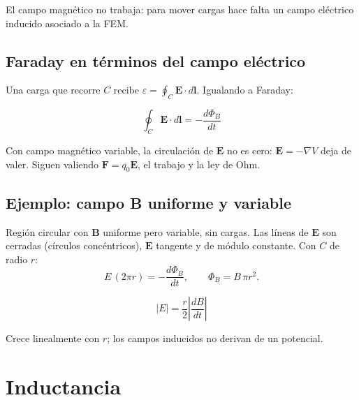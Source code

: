 \documentclass[12pt,a4paper]{article}
\begin{document}
El campo magnético no trabaja: para mover cargas hace falta un campo eléctrico
inducido asociado a la FEM.

\subsection{Faraday en términos del campo eléctrico}

Una carga que recorre $C$ recibe $\varepsilon = \oint_C \mathbf{E}\cdot
d\mathbf{l}$. Igualando a Faraday:

\begin{keybox}
  \[
  \boxed{\oint_C \mathbf{E}\cdot d\mathbf{l} = -\frac{d\Phi_B}{dt}}
  \]
\end{keybox}

\begin{warnbox}
  Con campo magnético variable, la circulación de $\mathbf{E}$ no es cero:
  $\mathbf{E} = -\nabla V$ deja de valer. Siguen valiendo $\mathbf{F}=q_0
  \mathbf{E}$, el trabajo y la ley de Ohm.
\end{warnbox}



\subsection{Ejemplo: campo B uniforme y variable}

Región circular con $\mathbf{B}$ uniforme pero variable, sin cargas. Las líneas
de $\mathbf{E}$ son cerradas (círculos concéntricos), $\mathbf{E}$ tangente y de
módulo constante. Con $C$ de radio $r$:
\[
E\,(2\pi r) = -\frac{d\Phi_B}{dt}, \qquad \Phi_B = B\,\pi r^2.
\]

\begin{keybox}
  \[
  \boxed{|E| = \frac{r}{2}\left|\frac{dB}{dt}\right|}
  \]
\end{keybox}

Crece linealmente con $r$; los campos inducidos no derivan de un potencial.



\section{Inductancia}
\end{document}
